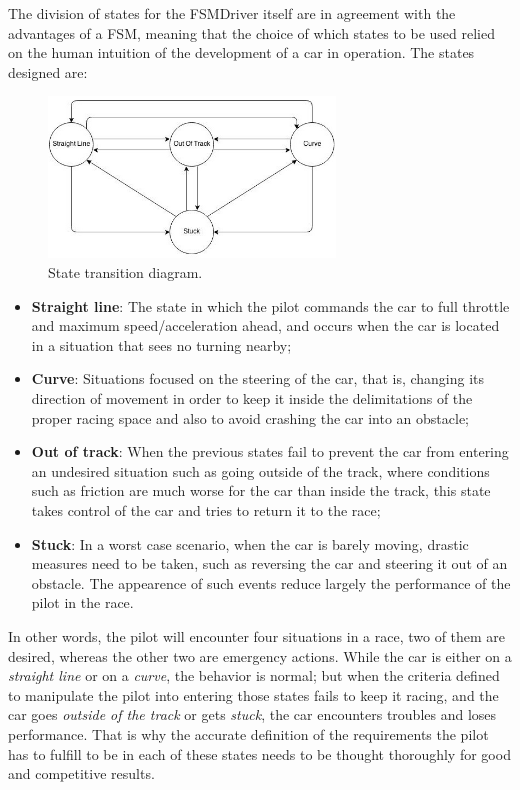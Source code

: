 	The division of states for the FSMDriver itself are in agreement with the advantages of a FSM, meaning that the choice of
	which states to be used relied on the human intuition of the development of a car in operation. The states designed are:

\begin{figure}[!t]
	\centering
	\includegraphics[width=3in]{StatesDiagram}
	\caption{State transition diagram.}
	\label{fig_sim}
\end{figure}

\begin{itemize}
	\item \textbf{Straight line}: The state in which the pilot commands the car to full throttle and maximum 
	speed/acceleration ahead, and occurs when the car is located in a situation that sees no turning nearby;
	
	\item \textbf{Curve}: Situations focused on the steering of the car, that is, changing its direction of movement
	in order to keep it inside the delimitations of the proper racing space and also to avoid crashing the car into
	an obstacle;
	
	\item \textbf{Out of track}: When the previous states fail to prevent the car from entering an undesired situation
	such as going outside of the track, where conditions such as friction are much worse for the car than inside the
	track, this state takes control of the car and tries to return it to the race;
	
	\item \textbf{Stuck}: In a worst case scenario, when the car is barely moving, drastic measures need to be taken,
	such as reversing the car and steering it out of an obstacle. The appearence of such events reduce largely the
	performance of the pilot in the race.
\end{itemize}

	In other words, the pilot will encounter four situations in a race, two of them are desired, whereas the other two are 
	emergency actions. While the car is either on a \emph{straight line} or on a \emph{curve}, the behavior is normal; 
	but when the criteria defined to manipulate the pilot into entering those states fails to keep it racing, and the car 
	goes \emph{outside of the track} or gets \emph{stuck}, the car encounters troubles and loses performance. That is why
	the accurate definition of the requirements the pilot has to fulfill to be in each of these states needs to be thought 
	thoroughly for good and competitive results.

